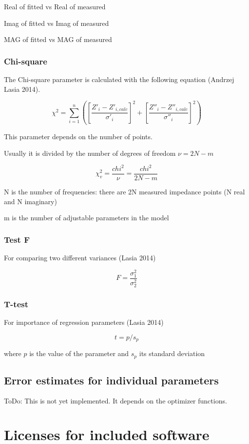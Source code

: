 \documentclass[10pt,a4paper,oneside]{book}
\begin{document}
Real of fitted vs Real of measured

Imag of fitted vs Imag of measured

MAG of fitted vs MAG of measured

\subsection{Chi-square}

The Chi-square parameter is calculated with the following equation (Andrzej Lasia 2014).

\[ \chi^2 = \sum_{i=1}^{n}{\left( \left[ \dfrac{Z'_i - Z'_{i,calc}}{\sigma'_i} \right]^2 + \left[ \dfrac{Z''_i - Z''_{i,calc}}{\sigma''_i} \right]^2 \right)} \]

This parameter depends on the number of points.

Usually it is divided by the number of degrees of freedom $\nu = 2N - m$

\[ \chi^2_v = \dfrac{chi^2}{\nu} = \dfrac{chi^2}{2N - m} \]

N is the number of frequencies: there are 2N measured impedance points (N real and N imaginary)

m is the number of adjustable parameters in the model


\subsection{Test F}

For comparing two different variances (Lasia 2014)

\[ F = \dfrac{\sigma_1^2}{\sigma_2^2} \]

\subsection{T-test}

For importance of regression parameters (Lasia 2014)

\[ t = p/s_p \]

where $p$ is the value of the parameter and $s_p$ its standard deviation


\section{Error estimates for individual parameters}

ToDo: This is not yet implemented. It depends on the optimizer functions.


\newpage{}
\chapter{Licenses for included software}
\end{document}
